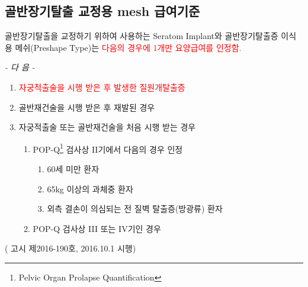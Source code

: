 \subsection{골반장기탈출 교정용 mesh 급여기준} 
골반장기탈출을 교정하기 위하여 사용하는 Seratom Implant와 골반장기탈출증 이식용 메쉬(Preshape Type)는 \textcolor{red}{다음의 경우에 1개만 요양급여를 인정함.}\par
\begin{center}\emph{- 다   음 -}\end{center}
\begin{enumerate}[1.]\tightlist
\item \textcolor{red}{자궁적출술을 시행 받은 후 발생한 질원개탈출증}
\item 골반재건술을 시행 받은 후 재발된 경우
\item 자궁적출술 또는 골반재건술을 처음 시행 받는 경우
	\begin{enumerate}[1)]\tightlist
	\item POP-Q\footnote{Pelvic Organ Prolapse Quantification} 검사상 II기에서 다음의 경우 인정 
		\begin{enumerate}[①]\tightlist
		\item 60세 미만 환자
		\item 65kg 이상의 과체중 환자
 		\item 외측 결손이 의심되는 전 질벽 탈출증(방광류) 환자 
		\end{enumerate}
	\item POP-Q 검사상 III 또는 IV기인 경우
	\end{enumerate}
\end{enumerate}	
( 고시 제2016-190호, 2016.10.1 시행)

